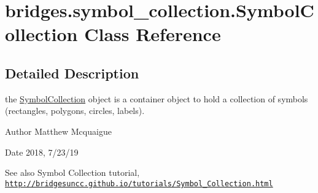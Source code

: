 \hypertarget{classbridges_1_1symbol__collection_1_1_symbol_collection}{}\section{bridges.\+symbol\+\_\+collection.\+Symbol\+Collection Class Reference}
\label{classbridges_1_1symbol__collection_1_1_symbol_collection}


\subsection{Detailed Description}
the \hyperlink{classbridges_1_1symbol__collection_1_1_symbol_collection}{Symbol\+Collection} object is a container object to hold a collection of symbols (rectangles, polygons, circles, labels). 

\begin{DoxyAuthor}{Author}
Matthew Mcquaigue
\end{DoxyAuthor}
\begin{DoxyDate}{Date}
2018, 7/23/19
\end{DoxyDate}
\begin{DoxySeeAlso}{See also}
Symbol Collection tutorial, \href{http://bridgesuncc.github.io/tutorials/Symbol_Collection.html}{\tt http\+://bridgesuncc.\+github.\+io/tutorials/\+Symbol\+\_\+\+Collection.\+html} 
\end{DoxySeeAlso}
